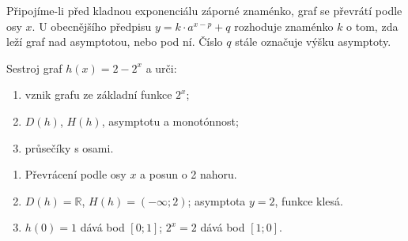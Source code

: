 \documentclass[11pt,a4paper]{article}
\begin{document}
Připojíme-li před kladnou exponenciálu záporné znaménko, graf se převrátí podle osy $x$. U obecnějšího předpisu $y=k\cdot a^{x-p}+q$ rozhoduje znaménko $k$ o tom, zda leží graf nad asymptotou, nebo pod ní. Číslo $q$ stále označuje výšku asymptoty.
\begin{prikladReseniBox}[title={Příklad 2}]
Sestroj graf $h(x)=2-2^x$ a urči:
\begin{enumerate}[label=\alph*)]
\item vznik grafu ze základní funkce $2^x$;
\item $D(h)$, $H(h)$, asymptotu a monotónnost;
\item průsečíky s osami.
\end{enumerate}
\tcblower
\begin{enumerate}[label=\alph*)]
\item Převrácení podle osy $x$ a posun o 2 nahoru.
\item $D(h)=\mathbb R$, $H(h)=(-\infty;2)$; asymptota $y=2$, funkce klesá.
\item $h(0)=1$ dává bod $[0;1]$; $2^x=2$ dává bod $[1;0]$.
\end{enumerate}\begin{center}
\end{center}
\end{prikladReseniBox}
\end{document}
